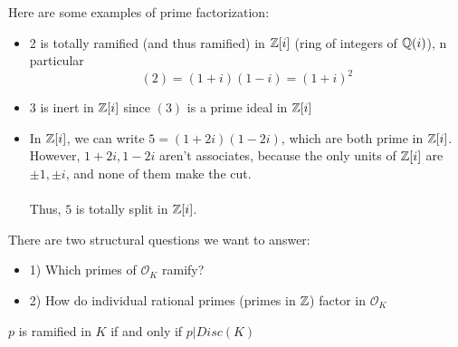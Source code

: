 \begin{example}
Here are some examples of prime factorization:
\begin{itemize}
    \item 2 is totally ramified (and thus ramified) in $\mathbb{Z}[i]$ (ring of integers of $\mathbb{Q}(i)$), n particular
\[(2) = (1 + i)(1 - i) = (1 + i)^2\]
    \item 3 is inert in $\mathbb{Z}[i]$ since $(3)$ is a prime ideal in $\mathbb{Z}[i]$
    \item In $\mathbb{Z}[i]$, we can write $5 = (1 + 2i)(1 - 2i)$, which are both prime in $\mathbb{Z}[i]$. However, $1 + 2i, 1 - 2i$ aren't associates, because the only units of $\mathbb{Z}[i]$ are $\pm 1, \pm i$, and none of them make the cut.\\\\
    Thus, $5$ is totally split in $\mathbb{Z}[i]$.
\end{itemize}
\end{example}

\noindent There are two structural questions we want to answer:
\begin{itemize}
    \item 1) Which primes of $\mathcal{O}_K$ ramify?
    \item 2) How do individual rational primes (primes in $\mathbb{Z}$) factor in $\mathcal{O}_K$
\end{itemize}

\begin{theorem}
$p$ is ramified in $K$ if and only if $p | Disc(K)$
\end{theorem}

